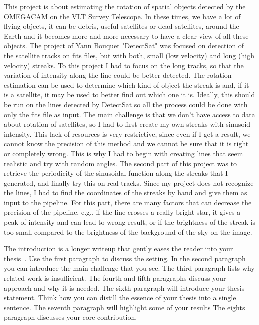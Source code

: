 \documentclass[a4paper,12pt,oneside]{report}
\begin{document}
This project is about estimating the rotation of spatial objects detected by the OMEGACAM on the VLT Survey Telescope. In these times,
we have a lot of flying objects, it can be debris, useful satellites or dead satellites, around the Earth and it becomes more and more
necessary to have a clear view of all these objects.
The project of Yann Bouquet "DetectSat"\cite{detectsatRepo} was focused on detection of the satellite tracks on fits files, but with both,
small (low velocity) and long (high velocity) streaks. To this project I had to focus on the long tracks, so that the variation of intensity
along the line could be better detected. The rotation estimation can be used to determine which kind of object the streak is and, if it is
a satellite, it may be used to better find out which one it is. Ideally, this should be run on the lines detected by DetectSat so all the process
could be done with only the fits file as input.
\newline
\newline
The main challenge is that we don't have access to data about rotation of satellites, so I had to first create my own streaks 
with sinusoid intensity. This lack of resources is very restrictive, since even if I get a result, we cannot know the precision of this method 
and we cannot be sure that it is right or completely wrong. This is why I had to begin with creating lines that seem realistic and
try with random angles.
\newline
\newline
The second part of this project was to retrieve the periodicity of the sinusoidal function along the streaks that I generated, and finally
try this on real tracks. Since my project does not recognize the lines, I had to find the coordinates of the streaks by hand and give them
as input to the pipeline. For this part, there are many factors that can decrease the precision of the pipeline, e.g., if the line crosses a
really bright star, it gives a peak of intensity and can lead to wrong result, or if the brightness of the streak is too small
compared to the brightness of the background of the sky on the image. 




The introduction is a longer writeup that gently eases the reader into your
thesis~\cite{dinesh20oakland}. Use the first paragraph to discuss the setting.
In the second paragraph you can introduce the main challenge that you see.
The third paragraph lists why related work is insufficient.
The fourth and fifth paragraphs discuss your approach and why it is needed.
The sixth paragraph will introduce your thesis statement. Think how you can
distill the essence of your thesis into a single sentence.
The seventh paragraph will highlight some of your results
The eights paragraph discusses your core contribution.
\end{document}
